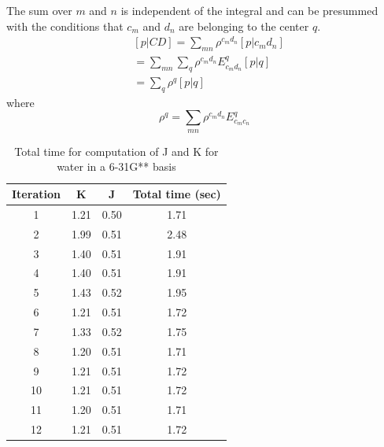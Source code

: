 \documentclass[12pt,a4paper,english]{beamer}
\begin{document}
\begin{frame}
        The sum over $m$ and $n$ is independent of the integral and can be presummed with the conditions that $c_m$ and $d_n$ are belonging to the center $q$.
        \begin{equation}
                \begin{split}
                        &[p|CD]=\sum_{mn}\rho^{c_md_n}[p|c_md_n]\\
                        &=\sum_{mn}\sum_q\rho^{c_md_n}E^q_{c_md_n}[p|q]\\
                        &=\sum_q\rho^q[p|q]
                \end{split}
                \label{}
        \end{equation}
        where
        \begin{equation}
                \rho^q=\sum_{mn}\rho^{c_md_n}E^q_{c_mc_n}
                \label{}
        \end{equation}
\end{frame}


%
\begin{frame}
        \begin{table}
                \centering
                \begin{tabular}{|c|c|c|c|}
                         Iteration & K&J&Total time (sec) \\
\hline
                         1 & 1.21 & 0.50 &1.71\\ 
                         2 & 1.99 & 0.51 &2.48\\ 
                         3 & 1.40 & 0.51 &1.91\\ 
                         4 & 1.40 & 0.51 &1.91\\ 
                         5 & 1.43 & 0.52 &1.95\\ 
                         6 & 1.21 & 0.51 &1.72\\ 
                         7 & 1.33 & 0.52 &1.75\\ 
                         8 & 1.20 & 0.51 &1.71\\ 
                         9 & 1.21 & 0.51 &1.72\\ 
                        10 & 1.21 & 0.51 &1.72\\ 
                        11 & 1.20 & 0.51 &1.71\\ 
                        12 & 1.21 & 0.51 &1.72\\ 
                \end{tabular}
                \caption{Total time for computation of J and K for water in a 6-31G** basis}
                \label{tab:1}
        \end{table}          
\end{frame}
  
\end{document}
